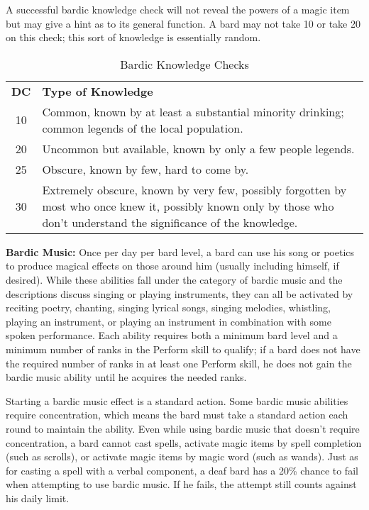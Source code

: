 A successful bardic knowledge check will not reveal the powers of a magic item 
but may give a hint as to its general function. A bard may not take 10 or take 
20 on this check; this sort of knowledge is essentially random. 

\begin{table}[htb]
\caption{Bardic Knowledge Checks}
\centering
\begin{tabular}{c p{15cm}}
\textbf{DC} & \textbf{Type of Knowledge} \\
10 & Common, known by at least a substantial minority drinking; common legends of the local population.\\
20 & Uncommon but available, known by only a few people legends.\\
25 & Obscure, known by few, hard to come by.\\
30 & Extremely obscure, known by very few, possibly forgotten by most who once knew it, possibly known only by those who don't understand the significance of the knowledge.\\
\end{tabular}
\end{table}

\textbf{Bardic Music:} Once per day per bard level, a bard can use his song or 
poetics to produce magical effects on those around him (usually including himself, 
if desired). While these abilities fall under the category of bardic music and 
the descriptions discuss singing or playing instruments, they can all be activated 
by reciting poetry, chanting, singing lyrical songs, singing melodies, whistling, 
playing an instrument, or playing an instrument in combination with some spoken 
performance. Each ability requires both a minimum bard level and a minimum number 
of ranks in the Perform skill to qualify; if a bard does not have the required 
number of ranks in at least one Perform skill, he does not gain the bardic music 
ability until he acquires the needed ranks.

Starting a bardic music effect is a standard action. Some bardic music abilities 
require concentration, which means the bard must take a standard action each round 
to maintain the ability. Even while using bardic music that doesn't require concentration, 
a bard cannot cast spells, activate magic items by spell completion (such as scrolls), 
or activate magic items by magic word (such as wands). Just as for casting a spell 
with a verbal component, a deaf bard has a 20\% chance to fail when attempting 
to use bardic music. If he fails, the attempt still counts against his daily limit.

